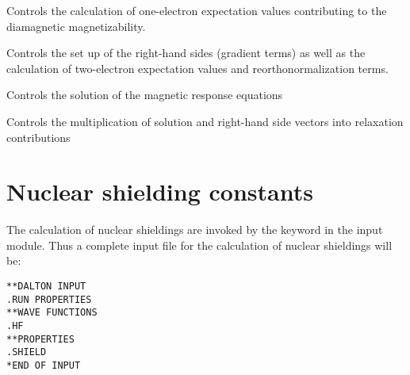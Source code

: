 \begin{list}{}{\itemsep 0.10cm \parsep 0.0cm}
\item[\Sec{EXPECT}] Controls the calculation of one-electron
expectation values contributing to the diamagnetic magnetizability.
\item[\Sec{GETSGY}] Controls the set up of the right-hand sides
(gradient terms) as well as the calculation of two-electron
expectation values and reorthonormalization terms.
\item[\Sec{LINRES}] Controls the solution of the magnetic response
equations
\item[\Sec{RELAX}] Controls the multiplication of solution and right-hand
side vectors into relaxation contributions
\end{list}

\section{Nuclear shielding constants}\label{sec:shieldings}

\begin{center}
\end{center}


The calculation of nuclear shieldings are
invoked by the
keyword  in the  input module. Thus
a complete input file for the calculation of nuclear shieldings will
be:

\begin{verbatim}
**DALTON INPUT
.RUN PROPERTIES
**WAVE FUNCTIONS
.HF
**PROPERTIES
.SHIELD
*END OF INPUT
\end{verbatim}

